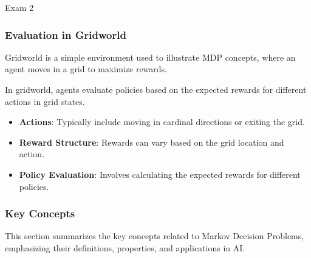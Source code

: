 \begin{examnotes}{Exam 2}
    \subsubsection*{Evaluation in Gridworld}
    
    Gridworld is a simple environment used to illustrate MDP concepts, where an agent moves in a grid to maximize rewards.
    
    \begin{highlight}
        In gridworld, agents evaluate policies based on the expected rewards for different actions in grid states.
        
        \begin{itemize}
            \item \textbf{Actions}: Typically include moving in cardinal directions or exiting the grid.
            \item \textbf{Reward Structure}: Rewards can vary based on the grid location and action.
            \item \textbf{Policy Evaluation}: Involves calculating the expected rewards for different policies.
        \end{itemize}
    \end{highlight}
    
    \subsubsection*{Key Concepts}
    
    \begin{highlight}
        This section summarizes the key concepts related to Markov Decision Problems, emphasizing their definitions, properties, and applications in AI.
        

\end{highlight}
\end{examnotes}
